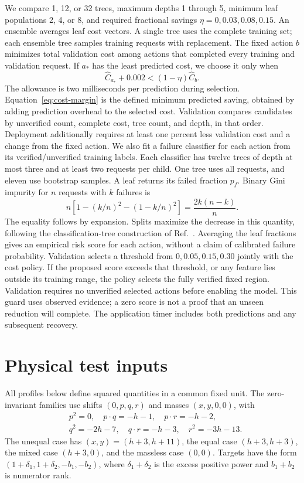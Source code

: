 We compare 1, 12, or 32 trees, maximum depths 1 through 5, minimum leaf populations 2, 4, or 8, and required fractional savings $\eta=0,0.03,0.08,0.15$. An ensemble averages leaf cost vectors. A single tree uses the complete training set; each ensemble tree samples training requests with replacement. The fixed action $b$ minimizes total validation cost among actions that completed every training and validation request. If $a_*$ has the least predicted cost, we choose it only when
\begin{equation}
 \widehat C_{a_*}+0.002 < (1-\eta)\widehat C_b.
 \label{eq:cost-margin}
\end{equation}
The allowance is two milliseconds per prediction during selection. Equation~\eqref{eq:cost-margin} is the defined minimum predicted saving, obtained by adding prediction overhead to the selected cost. Validation compares candidates by unverified count, complete cost, tree count, and depth, in that order. Deployment additionally requires at least one percent less validation cost and a change from the fixed action. We also fit a failure classifier for each action from its verified/unverified training labels. Each classifier has twelve trees of depth at most three and at least two requests per child. One tree uses all requests, and eleven use bootstrap samples. A leaf returns its failed fraction $p_f$. Binary Gini impurity for $n$ requests with $k$ failures is
\begin{equation}
 n\left[1-(k/n)^2-(1-k/n)^2\right]=\frac{2k(n-k)}{n}.
 \label{eq:failure-gini}
\end{equation}
The equality follows by expansion. Splits maximize the decrease in this quantity, following the classification-tree construction of Ref.~\cite{CART1984}. Averaging the leaf fractions gives an empirical risk score for each action, without a claim of calibrated failure probability. Validation selects a threshold from $0,0.05,0.15,0.30$ jointly with the cost policy. If the proposed score exceeds that threshold, or any feature lies outside its training range, the policy selects the fully verified fixed region. Validation requires no unverified selected actions before enabling the model. This guard uses observed evidence; a zero score is not a proof that an unseen reduction will complete. The application timer includes both predictions and any subsequent recovery.

\section{Physical test inputs}
\label{app:families-new}
All profiles below define squared quantities in a common fixed unit. The zero-invariant families use shifts $(0,p,q,r)$ and masses $(x,y,0,0)$, with
\begin{align}
 &p^2=0,\quad p\cdot q=-h-1,\quad p\cdot r=-h-2,\nonumber\\
 &q^2=-2h-7,\quad q\cdot r=-h-3,\quad r^2=-3h-13.
 \label{eq:light-input}
\end{align}
The unequal case has $(x,y)=(h+3,h+11)$, the equal case $(h+3,h+3)$, the mixed case $(h+3,0)$, and the massless case $(0,0)$. Targets have the form $(1+\delta_1,1+\delta_2,-b_1,-b_2)$, where $\delta_1+\delta_2$ is the excess positive power and $b_1+b_2$ is numerator rank.

